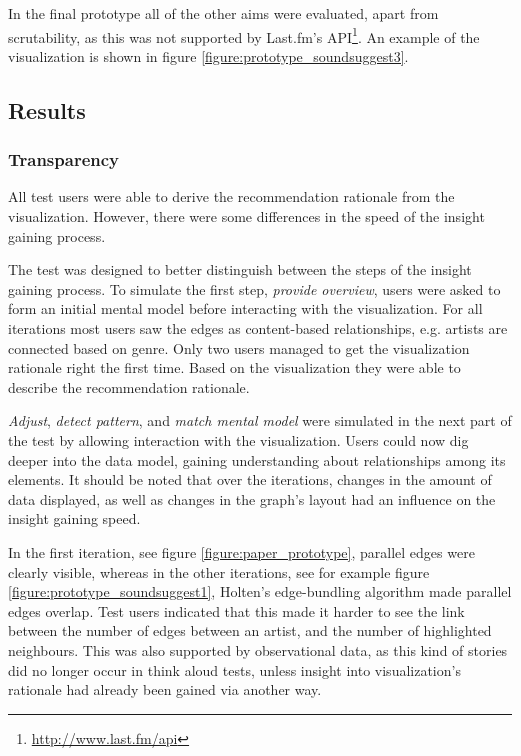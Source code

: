 \documentclass[a4paper,10pt,twocolumn]{article}
\begin{document}
In the final prototype all of the other aims were evaluated, apart from scrutability, as this was not supported by Last.fm's API\footnote{\url{http://www.last.fm/api}}. An example of the visualization is shown in figure \ref{figure:prototype_soundsuggest3}.



\subsection{Results}\label{section:evaluation:subsection:results}


\subsubsection{Transparency}

All test users were able to derive the recommendation rationale from the visualization. However, there were some differences in the speed of the insight gaining process.

The test was designed to better distinguish between the steps of the insight gaining process. To simulate the first step, \emph{provide overview}, users were asked to form an initial mental model before interacting with the visualization. For all iterations most users saw the edges as content-based relationships, e.g. artists are connected based on genre. Only two users managed to get the visualization rationale right the first time. Based on the visualization they were able to describe the recommendation rationale.

\emph{Adjust}, \emph{detect pattern}, and \emph{match mental model} were simulated in the next part of the test by allowing interaction with the visualization. Users could now dig deeper into the data model, gaining understanding about relationships among its elements. It should be noted that over the iterations, changes in the amount of data displayed, as well as changes in the graph's layout had an influence on the insight gaining speed.

In the first iteration, see figure \ref{figure:paper_prototype}, parallel edges were clearly visible, whereas in the other iterations, see for example figure \ref{figure:prototype_soundsuggest1}, Holten's edge-bundling algorithm made parallel edges overlap. Test users indicated that this made it harder to see the link between the number of edges between an artist, and the number of highlighted neighbours. This was also supported by observational data, as this kind of stories did no longer occur in think aloud tests, unless insight into visualization's rationale had already been gained via another way.
\end{document}
